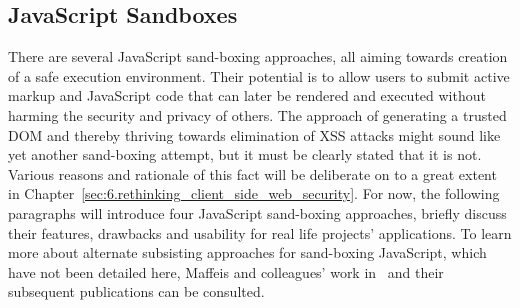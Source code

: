 


  

  \subsection{JavaScript Sandboxes}
  \label{subsec:4.10.javascript_sandboxing}

    There are several JavaScript sand-boxing approaches, all aiming towards creation of a safe execution environment. Their potential is to allow users to submit active markup and JavaScript code that can later be rendered and executed without harming the security and privacy of others. The approach of generating a trusted DOM and thereby thriving towards elimination of XSS attacks might sound like yet another sand-boxing attempt, but it must be clearly stated that it is not. Various reasons and rationale of this fact will be deliberate on to a great extent in Chapter~\ref{sec:6.rethinking_client_side_web_security}. For now, the following paragraphs will introduce four JavaScript sand-boxing approaches, briefly discuss their features, drawbacks and usability for real life projects' applications. To learn more about alternate subsisting approaches for sand-boxing JavaScript, which have not been detailed here, Maffeis and colleagues' work in~\cite{MMT-CSF-TR09} and their subsequent publications can be 
consulted.

